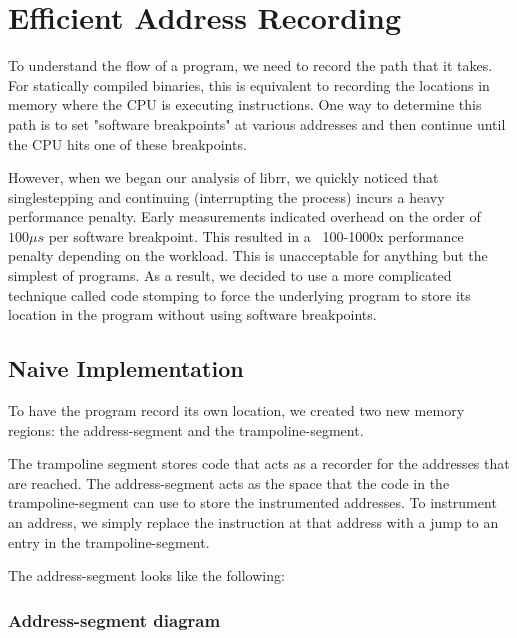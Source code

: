 \chapter{Efficient Address Recording}

To understand the flow of a program, we need to record the path that it takes. For statically compiled binaries, this is equivalent to recording the locations in memory where the CPU is executing instructions. One way to determine this path is to set "software breakpoints" at various addresses and then continue until the CPU hits one of these breakpoints.

However, when we began our analysis of librr, we quickly noticed that singlestepping and continuing (interrupting the process) incurs a heavy performance penalty. Early measurements indicated overhead on the order of $100 \mu s$ per software breakpoint. This resulted in a ~100-1000x performance penalty depending on the workload. This is unacceptable for anything but the simplest of programs. As a result, we decided to use a more complicated technique called code stomping to force the underlying program to store its location in the program without using software breakpoints.

\section{Naive Implementation}

To have the program record its own location, we created two new memory regions: the address-segment and the trampoline-segment.

The trampoline segment stores code that acts as a recorder for the addresses that are reached. The address-segment acts as the space that the code in the trampoline-segment can use to store the instrumented addresses. To instrument an address, we simply replace the instruction at that address with a jump to an entry in the trampoline-segment.

The address-segment looks like the following:
\subsection{Address-segment diagram}
\begin{drawstack}
  \startframe
   
  \startframe
   \cellcom{}
   
   \cellcom{}
   \cellcom{}
   \cellcom{}
   
\end{drawstack}

